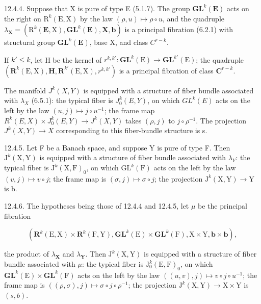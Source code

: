 12.4.4. Suppose that X is pure of type E (5.1.7). The group \(\mathbf{GL}^{k}(\mathbf{E})\) acts on the right on \(\mathrm{R}^{k}(\mathrm{E},\mathrm{X})\) by the law \((\rho,u)\mapsto\rho\circ u\), and the quadruple \(\lambda_{\mathbf{X}}=(\mathrm{R}^{k}(\mathbf{E},\mathrm{X}),\mathbf{GL}^{k}(\mathbf{E}),\mathbf{X},\mathbf{b})\) is a principal fibration (6.2.1) with structural group \(\mathbf{GL}^{k}(\mathbf{E})\), base X, and class \(C^{r-k}\).

If \(k' \leqslant k\), let H be the kernel of \(r^{k, k'} \colon \mathbf{GL}^{k}(\mathrm{E}) \to \mathbf{GL}^{k'}(\mathrm{E})\); the quadruple \((\mathbf{R}^k(\mathrm{E}, \mathrm{X}), \mathbf{H}, \mathbf{R}^{k'}(\mathrm{E}, \mathrm{X}), r^{k, k'})\) is a principal fibration of class \(\mathbf{C}^{r-k}\).

The manifold \(J^{k}(X,Y)\) is equipped with a structure of fiber bundle associated with \(\lambda_{X}\) (6.5.1): the typical fiber is \(J_{0}^{k}(E,Y)\), on which \(GL^{k}(E)\) acts on the left by the law \((u,j)\mapsto j\circ u^{-1}\); the frame map \(R^{k}(E,X)\times J_{0}^{k}(E,Y)\to J^{k}(X,Y)\) takes \((\rho,j)\) to \(j\circ\rho^{-1}\). The projection \(J^{k}(X,Y)\to X\) corresponding to this fiber-bundle structure is s.

12.4.5. Let F be a Banach space, and suppose Y is pure of type F. Then \(\mathrm{J}^{k}(\mathrm{X},\mathrm{Y})\) is equipped with a structure of fiber bundle associated with \(\lambda_{Y}\): the typical fiber is \(\mathrm{J}^{k}(\mathrm{X},\mathrm{F})_{0}\), on which \(\mathrm{GL}^{k}(\mathrm{F})\) acts on the left by the law \((v,j)\mapsto v\circ j\); the frame map is \((\sigma,j)\mapsto\sigma\circ j\); the projection \(\mathrm{J}^{k}(\mathrm{X},\mathrm{Y})\to\mathrm{Y}\) is b.

12.4.6. The hypotheses being those of 12.4.4 and 12.4.5, let \(\mu\) be the principal fibration

\[
(\mathbf {R} ^ {k} (\mathrm{E}, \mathrm{X}) \times \mathbf {R} ^ {k} (\mathrm{F}, \mathrm{Y}), \mathbf {G L} ^ {k} (\mathrm{E}) \times \mathbf {G L} ^ {k} (\mathrm{F}), \mathrm{X} \times \mathrm{Y}, \boldsymbol {b} \times \boldsymbol {b}),
\]

the product of \(\lambda_{\mathbf{X}}\) and \(\lambda_{\mathbf{Y}}\). Then \(\mathrm{J}^{k}(\mathrm{X},\mathrm{Y})\) is equipped with a structure of fiber bundle associated with \(\mu\): the typical fiber is \(\mathrm{J}_{0}^{k}(\mathrm{E},\mathrm{F})_{0}\), on which \(\mathbf{GL}^{k}(\mathrm{E})\times \mathbf{GL}^{k}(\mathrm{F})\) acts on the left by the law \(((u,v),j)\mapsto v\circ j\circ u^{-1}\); the frame map is \(((\rho ,\sigma),j)\mapsto \sigma \circ j\circ \rho^{-1}\); the projection \(\mathrm{J}^k (\mathrm{X},\mathrm{Y})\to \mathrm{X}\times \mathrm{Y}\) is \((s,b)\).

